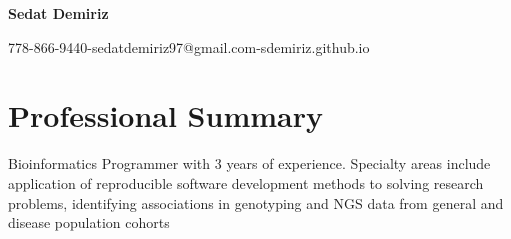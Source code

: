 \documentclass{article}
\makeatletter
\newcommand{\name}{Sedat Demiriz}
\newcommand{\email}{sedatdemiriz97@gmail.com}
\newcommand{\phone}{778-866-9440}
\newcommand{\website}{sdemiriz.github.io}
\makeatother
\begin{document}
\begin{minipage}[t]{1\textwidth} 
  \centering \Huge 
  \textbf{\name} \vspace{.5em} 
\end{minipage}
\begin{minipage}[t]{1\textwidth} 
  \centering \normalsize 
  \phone\hspace{0.5em}-\hspace{0.5em}\email\hspace{0.5em}-\hspace{0.5em}\website
\end{minipage}

\section*{Professional Summary} \vspace{-1em} \hrulefill \vspace{.5em}

\noindent Bioinformatics Programmer with 3 years of experience. Specialty areas include application of reproducible
software development methods to solving research problems, identifying associations in genotyping and NGS data from 
general and disease population cohorts

\end{document}
